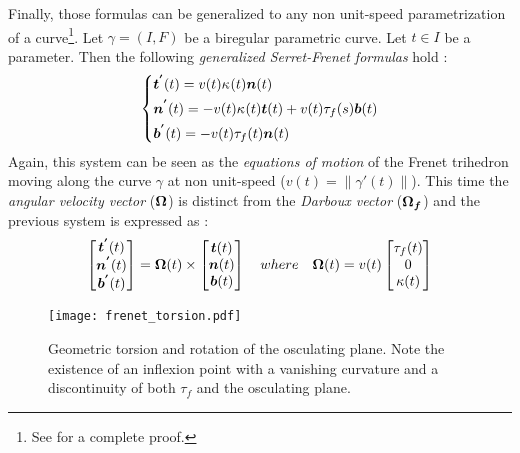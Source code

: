 Finally, those formulas can be generalized to any non unit-speed parametrization of a curve\footnote{See \cite[p.203]{Gray2006} for a complete proof.}. Let $\gamma = (I,F)$ be a biregular parametric curve. Let $t \in I$ be a parameter. Then the following \emph{generalized Serret-Frenet formulas} hold :
\begin{equation}
	\left\{
	\begin{aligned}
		&\boldsymbol{t^{'}}(t) 	=  v(t) \kappa_{}(t) \boldsymbol{n}(t)\\
		&\boldsymbol{n^{'}}(t) 	=  -v(t) \kappa_{}(t) \boldsymbol{t}(t) + v(t) \tau_f(s) \boldsymbol{b}(t) \\
		&\boldsymbol{b^{'}}(t) 	=  -v(t) \tau_f(t) \boldsymbol{n}(t) \\
	\end{aligned}
	\right.
\end{equation}
Again, this system can be seen as the \emph{equations of motion} of the Frenet trihedron moving along the curve $\gamma$ at non unit-speed ($v(t) = \|\gamma'(t)\|$). This time the \emph{angular velocity vector} ($\boldsymbol{\Omega}$) is distinct from the \emph{Darboux vector} ($\boldsymbol{\Omega_f}$) and the previous system is expressed as :
\begin{equation}
	\begin{bmatrix}		
		\boldsymbol{t^{'}}(t) \\
		\boldsymbol{n^{'}}(t) \\
		\boldsymbol{b^{'}}(t) \\
	\end{bmatrix}
	=
	\boldsymbol{\Omega}(t)
	\times
	\begin{bmatrix}		
		\boldsymbol{t}(t) \\
		\boldsymbol{n}(t) \\
		\boldsymbol{b}(t) \\
	\end{bmatrix}
	\quad where \quad
	\boldsymbol{\Omega}(t)
	=
	v(t)
	\begin{bmatrix}
		\tau_f(t) \\
		0 \\
		\kappa(t)
	\end{bmatrix}
\end{equation}


\begin{figure}[t]
	\centering
	\texttt{[image: frenet\_torsion.pdf]}
	\caption{Geometric torsion and rotation of the osculating plane. Note the existence of an inflexion point with a vanishing curvature and a discontinuity of both $\tau_f$ and the osculating plane.}
	\label{fig:3_3}
\end{figure}

